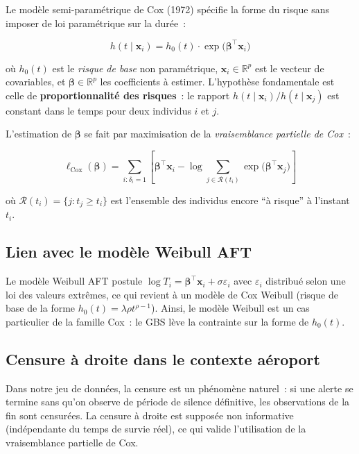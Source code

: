 \documentclass[a4paper,11pt]{article}
\newcommand{\Real}{\mathbb{R}}
\begin{document}
Le modèle semi-paramétrique de Cox (1972) spécifie la forme du risque sans imposer de loi
paramétrique sur la durée~:

\begin{equation}
  h(t \mid \mathbf{x}_i) = h_0(t) \cdot \exp\!\bigl(\boldsymbol{\beta}^\top \mathbf{x}_i\bigr)
  \label{eq:cox}
\end{equation}

où $h_0(t)$ est le \emph{risque de base} non paramétrique, $\mathbf{x}_i \in \Real^p$ est le
vecteur de covariables, et $\boldsymbol{\beta} \in \Real^p$ les coefficients à estimer. L'hypothèse
fondamentale est celle de \textbf{proportionnalité des risques}~: le rapport $h(t \mid
\mathbf{x}_i) / h(t \mid \mathbf{x}_j)$ est constant dans le temps pour deux individus $i$ et $j$.

L'estimation de $\boldsymbol{\beta}$ se fait par maximisation de la \emph{vraisemblance partielle
de Cox}~:

\begin{equation}
  \ell_{\mathrm{Cox}}(\boldsymbol{\beta}) = \sum_{i : \delta_i = 1}
  \left[
    \boldsymbol{\beta}^\top \mathbf{x}_i
    - \log \sum_{j \in \mathcal{R}(t_i)} \exp\!\bigl(\boldsymbol{\beta}^\top \mathbf{x}_j\bigr)
  \right]
  \label{eq:partial_likelihood}
\end{equation}

où $\mathcal{R}(t_i) = \{j : t_j \geq t_i\}$ est l'ensemble des individus encore ``à risque'' à
l'instant $t_i$.

\subsection{Lien avec le modèle Weibull AFT}

Le modèle Weibull AFT postule $\log T_i = \boldsymbol{\beta}^\top \mathbf{x}_i + \sigma \varepsilon_i$
avec $\varepsilon_i$ distribué selon une loi des valeurs extrêmes, ce qui revient à un modèle de
Cox Weibull (risque de base de la forme $h_0(t) = \lambda \rho t^{\rho-1}$). Ainsi, le modèle
Weibull est un cas particulier de la famille Cox~: le GBS lève la contrainte sur la forme de
$h_0(t)$.

\subsection{Censure à droite dans le contexte aéroport}

Dans notre jeu de données, la censure est un phénomène naturel~: si une alerte se termine sans
qu'on observe de période de silence définitive, les observations de la fin sont censurées. La
censure à droite est supposée non informative (indépendante du temps de survie réel), ce qui
valide l'utilisation de la vraisemblance partielle de Cox.
\end{document}
